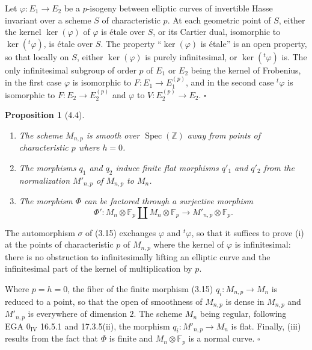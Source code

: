 \documentclass[10pt]{article}
\newcommand{\F}{\mathbb F}
\newcommand{\Z}{\mathbb Z}
\newcommand{\Spec}{\operatorname{Spec}}
\newcommand{\QED}{\hfill$\square$}
\newtheorem*{proposition}{Proposition}
\begin{document}
Let $\varphi:E_1\to E_2$ be a $p$-isogeny between elliptic curves of invertible Hasse invariant over a scheme $S$ of characteristic $p$. At each geometric point of $S$, either the kernel $\ker(\varphi)$ of $\varphi$ is étale over $S$, or its Cartier dual, isomorphic to $\ker({}^{t}\!\varphi)$, is étale over $S$. The property ``$\ker(\varphi)$ is étale'' is an open property, so that locally on $S$, either $\ker(\varphi)$ is purely infinitesimal, or $\ker({}^{t}\!\varphi)$ is. The only infinitesimal subgroup of order $p$ of $E_1$ or $E_2$ being the kernel of Frobenius, in the first case $\varphi$ is isomorphic to $F:E_1\to E_1^{(p)}$, and in the second case ${}^{t}\!\varphi$ is isomorphic to $F:E_2\to E_2^{(p)}$ and $\varphi$ to $V:E_2^{(p)}\to E_2$. \QED

\begin{proposition}[4.4]
\leavevmode
\begin{enumerate}[label=(\roman*)]
\item The scheme $M_{n,p}$ is smooth over $\Spec(\Z)$ away from points of characteristic $p$ where $h=0$.
\item The morphisms $q_1$ and $q_2$ induce finite flat morphisms $q'_1$ and $q'_2$ from the normalization $M'_{n,p}$ of $M_{n,p}$ to $M_n$.
\item The morphism $\Phi$ can be factored through a surjective morphism
\[
\Phi':M_n\otimes\F_p\coprod M_n\otimes\F_p\to M'_{n,p}\otimes\F_p.
\]
\end{enumerate}
\end{proposition}

The automorphism $\sigma$ of (3.15) exchanges $\varphi$ and ${}^{t}\!\varphi$, so that it suffices to prove (i) at the points of characteristic $p$ of $M_{n,p}$ where the kernel of $\varphi$ is infinitesimal: there is no obstruction to infinitesimally lifting an elliptic curve and the infinitesimal part of the kernel of multiplication by $p$.

Where $p=h=0$, the fiber of the finite morphism (3.15) $q_i:M_{n,p}\to M_n$ is reduced to a point, so that the open of smoothness of $M_{n,p}$ is dense in $M_{n,p}$ and $M'_{n,p}$ is everywhere of dimension $2$. The scheme $M_n$ being regular, following EGA $0_{\mathrm{IV}}$ 16.5.1 and 17.3.5(ii), the morphism $q_i:M'_{n,p}\to M_n$ is flat. Finally, (iii) results from the fact that $\Phi$ is finite and $M_n\otimes\F_p$ is a normal curve. \QED
\end{document}
